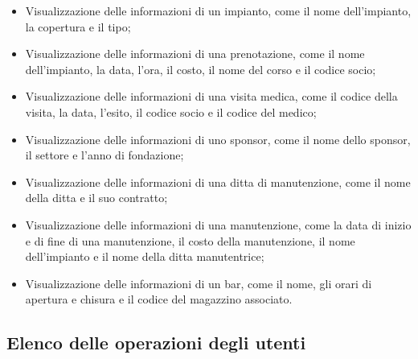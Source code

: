 \documentclass{article}
\begin{document}
\begin{flushleft}
\begin{enumerate}
\begin{itemize}
                \item Visualizzazione delle informazioni di un impianto, come il nome dell'impianto, la copertura e il tipo;
                \item Visualizzazione delle informazioni di una prenotazione, come il nome dell'impianto, la data, l'ora, il costo, il nome del corso e il codice socio;
                \item Visualizzazione delle informazioni di una visita medica, come il codice della visita, la data, l'esito, il codice socio e il codice del medico;
                \item Visualizzazione delle informazioni di uno sponsor, come il nome dello sponsor, il settore e l'anno di fondazione;
                \item Visualizzazione delle informazioni di una ditta di manutenzione, come il nome della ditta e il suo contratto;
                \item Visualizzazione delle informazioni di una manutenzione, come la data di inizio e di fine di una manutenzione, il costo della manutenzione, il nome dell'impianto e il nome della ditta manutentrice;
                \item Visualizzazione delle informazioni di un bar, come il nome, gli orari di apertura e chisura e il codice del magazzino associato.
            \end{itemize}
        \end{enumerate}
    \end{flushleft}

\subsection{Elenco delle operazioni degli utenti}
\end{document}
